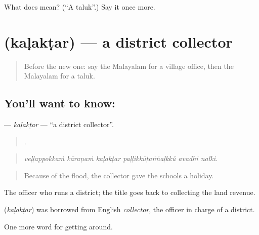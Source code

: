 \begin{tcolorbox}[breakable,colback=teal!4,colframe=teal!35!black,title={Before you move on}]
What does  mean? (\textquotedblleft{}A taluk\textquotedblright{}.) Say it once more.
\end{tcolorbox}
\section[\texorpdfstring{\ml{കളക്ടർ} (kaḷakṭar)}{കളക്ടർ (kaḷakṭar)}]{ (kaḷakṭar) — a district collector}

\label{lesson:ML-C487-kalaktar}



\begin{quote}
Before the new one: say the Malayalam for a village office, then the Malayalam for a taluk.
\end{quote}

\subsection*{You'll want to know: }
\textbf{} — \emph{kaḷakṭar} — \textquotedblleft{}a district collector\textquotedblright{}.

\begin{quote}
     .
\end{quote}

\begin{quote}
\emph{veḷḷappokkaṁ kāraṇaṁ kaḷakṭar paḷḷikkūṭaṅṅaḷkkŭ avadhi nalki.}
\end{quote}

\begin{quote}
Because of the flood, the collector gave the schools a holiday.
\end{quote}

The officer who runs a district; the title goes back to collecting the land revenue.

\begin{cousinweb}
\textbf{} (\emph{kaḷakṭar}) was borrowed from English \emph{collector}, the officer in charge of a district.
\end{cousinweb}

\begin{grammarlens}[title={What you've built}]
One more word for getting around.
\end{grammarlens}


